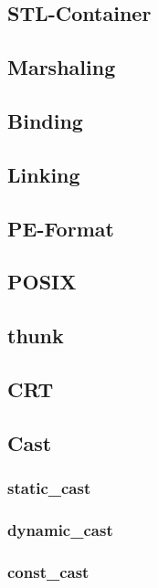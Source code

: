 \begin{multicols}{3}
\subsection{STL-Container}
\lipsum[1]

\subsection{Marshaling}
\lipsum[1]

\subsection{Binding}
\lipsum[1]

\subsection{Linking}
\lipsum[1]

\subsection{PE-Format}
\lipsum[1]

\subsection{POSIX}
\lipsum[1]

\subsection{thunk}
\lipsum[1]
\subsection{CRT}
\lipsum[1]

\subsection{Cast}

\subsubsection{static_cast}
\lipsum[1]
\subsubsection{dynamic_cast}
\lipsum[1]
\subsubsection{const_cast}
\lipsum[1]

\end{multicols}
